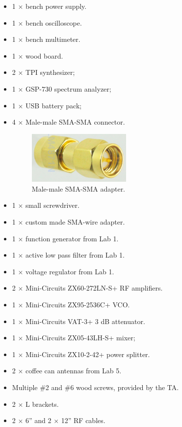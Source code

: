 \documentclass[letterpaper, 11pt]{article}
\begin{document}
\begin{itemize}[itemsep=0.5ex]
	\item 1 $\times$ bench power supply.
	\item 1 $\times$ bench oscilloscope.
	\item 1 $\times$ bench multimeter.
	\item 1 $\times$ wood board.
	\item 2 $\times$ TPI synthesizer;
	\item 1 $\times$ GSP-730 spectrum analyzer;
	\item 1 $\times$ USB battery pack;
	\item 4 $\times$ Male-male SMA-SMA connector. 
		\begin{figure}[h]
			\centering
			\includegraphics[width=2in]{sma-sma.png} 
			\caption{Male-male SMA-SMA adapter.}
			\label{fig:sma-sma}
		\end{figure}
	\item 1 $\times$ small screwdriver.
	\item 1 $\times$ custom made SMA-wire adapter.
	\item 1 $\times$ function generator from Lab 1.
	\item 1 $\times$ active low pass filter from Lab 1. 
	\item 1 $\times$ voltage regulator from Lab 1.
	\item 2 $\times$ Mini-Circuits ZX60-272LN-S+ RF amplifiers. 
	\item 1 $\times$ Mini-Circuits ZX95-2536C+ VCO. 
	\item 1 $\times$ Mini-Circuits VAT-3+ 3 dB attenuator. 
	\item 1 $\times$ Mini-Circuits ZX05-43LH-S+ mixer;
	\item 1 $\times$ Mini-Circuits ZX10-2-42+ power splitter. 
	\item 2 $\times$ coffee can antennas from Lab 5.
	\item Multiple \#2 and \#6 wood screws, provided by the TA. 
	\item 2 $\times$ L brackets. 
	\item 2 $\times$ 6'' and 2 $\times$ 12'' RF cables.
\end{itemize}
\end{document}
